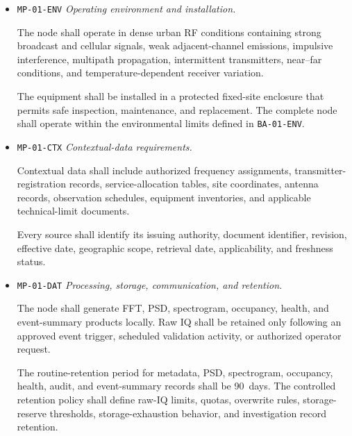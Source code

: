 \documentclass[11pt,a4paper]{article}
\begin{document}
\begin{itemize}[leftmargin=*]
		Event records shall provide a timestamp resolution of 1~ms or better.
		\texttt{BA-01-TIM} shall separately define the maximum timestamp error,
		timestamp origin, processing-latency treatment, holdover behavior,
		discontinuity handling, and reported uncertainty. The baseline shall not
		claim UTC-referenced sample timestamps.
		
		The verified coordinates of the fixed site and the timing-source,
		reference-lock, timestamp-validity, and discontinuity states shall be
		recorded with each applicable observation.
		
		\item \texttt{MP-01-ENV} \emph{Operating environment and installation.}
		
		The node shall operate in dense urban RF conditions containing strong
		broadcast and cellular signals, weak adjacent-channel emissions,
		impulsive interference, multipath propagation, intermittent transmitters,
		near--far conditions, and temperature-dependent receiver variation.
		
		The equipment shall be installed in a protected fixed-site enclosure that
		permits safe inspection, maintenance, and replacement. The complete node
		shall operate within the environmental limits defined in
		\texttt{BA-01-ENV}.
		
		\item \texttt{MP-01-CTX} \emph{Contextual-data requirements.}
		
		Contextual data shall include authorized frequency assignments,
		transmitter-registration records, service-allocation tables, site
		coordinates, antenna records, observation schedules, equipment
		inventories, and applicable technical-limit documents.
		
		Every source shall identify its issuing authority, document identifier,
		revision, effective date, geographic scope, retrieval date, applicability,
		and freshness status.
		
		\item \texttt{MP-01-DAT} \emph{Processing, storage, communication, and
			retention.}
		
		The node shall generate FFT, PSD, spectrogram, occupancy, health, and
		event-summary products locally. Raw IQ shall be retained only following an
		approved event trigger, scheduled validation activity, or authorized
		operator request.
		
		The routine-retention period for metadata, PSD, spectrogram, occupancy,
		health, audit, and event-summary records shall be 90~days. The controlled
		retention policy shall define raw-IQ limits, quotas, overwrite rules,
		storage-reserve thresholds, storage-exhaustion behavior, and investigation
		record retention.
		

\end{itemize}
\end{document}
